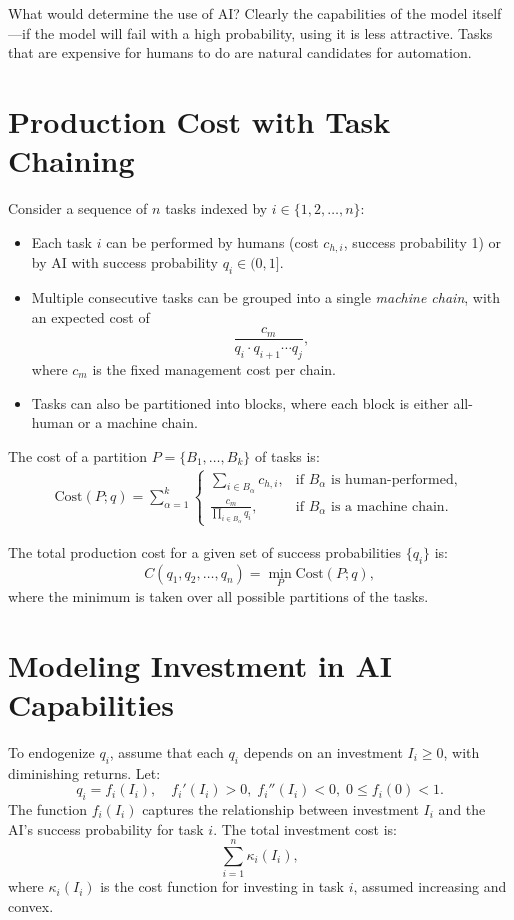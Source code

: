 \documentclass{article}
\begin{document}
What would determine the use of AI? 
Clearly the capabilities of the model itself---if the model will fail with a high probability, using it is less attractive.
Tasks that are expensive for humans to do are natural candidates for automation.

\section{Production Cost with Task Chaining}
Consider a sequence of $n$ tasks indexed by $i \in \{1, 2, \dots, n\}$:
\begin{itemize}
    \item Each task $i$ can be performed by humans (cost $c_{h,i}$, success probability 1) or by AI with success probability $q_i \in (0, 1]$.
    \item Multiple consecutive tasks can be grouped into a single \emph{machine chain}, with an expected cost of
    \[
        \frac{c_m}{q_i \cdot q_{i+1} \cdots q_j},
    \]
    where $c_m$ is the fixed management cost per chain.
    \item Tasks can also be partitioned into blocks, where each block is either all-human or a machine chain.
\end{itemize}

The cost of a partition $P = \{B_1, \dots, B_k\}$ of tasks is:
\begin{align*}
    \text{Cost}(P; q) = \sum_{\alpha=1}^k \begin{cases}
        \sum_{i \in B_\alpha} c_{h,i}, & \text{if $B_\alpha$ is human-performed}, \\
        \frac{c_m}{\prod_{i \in B_\alpha} q_i}, & \text{if $B_\alpha$ is a machine chain}.
    \end{cases}
\end{align*}

The total production cost for a given set of success probabilities $\{q_i\}$ is:
\[
    C(q_1, q_2, \dots, q_n) = \min_P \text{Cost}(P; q),
\]
where the minimum is taken over all possible partitions of the tasks.

\section{Modeling Investment in AI Capabilities}
To endogenize $q_i$, assume that each $q_i$ depends on an investment $I_i \geq 0$, with diminishing returns. Let:
\[
    q_i = f_i(I_i), \quad f_i'(I_i) > 0, \; f_i''(I_i) < 0, \; 0 \leq f_i(0) < 1.
\]
The function $f_i(I_i)$ captures the relationship between investment $I_i$ and the AI's success probability for task $i$. The total investment cost is:
\[
    \sum_{i=1}^n \kappa_i(I_i),
\]
where $\kappa_i(I_i)$ is the cost function for investing in task $i$, assumed increasing and convex.
\end{document}
